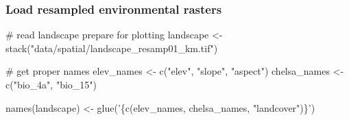 \documentclass[
]{article}
\newenvironment{Shaded}{}{}
\newcommand{\CommentTok}[1]{\textcolor[rgb]{0.00,0.50,0.00}{#1}}
\newcommand{\KeywordTok}[1]{\textcolor[rgb]{0.00,0.00,1.00}{#1}}
\newcommand{\NormalTok}[1]{#1}
\newcommand{\StringTok}[1]{\textcolor[rgb]{0.00,0.50,0.50}{#1}}
\begin{document}
\hypertarget{load-resampled-environmental-rasters}{%
\subsubsection{Load resampled environmental rasters}\label{load-resampled-environmental-rasters}}

\begin{Shaded}
\begin{Highlighting}[]
\CommentTok{# read landscape prepare for plotting}
\NormalTok{landscape <-}\StringTok{ }\KeywordTok{stack}\NormalTok{(}\StringTok{"data/spatial/landscape_resamp01_km.tif"}\NormalTok{)}

\CommentTok{# get proper names}
\NormalTok{elev_names <-}\StringTok{ }\KeywordTok{c}\NormalTok{(}\StringTok{"elev"}\NormalTok{, }\StringTok{"slope"}\NormalTok{, }\StringTok{"aspect"}\NormalTok{)}
\NormalTok{chelsa_names <-}\StringTok{ }\KeywordTok{c}\NormalTok{(}\StringTok{"bio_4a"}\NormalTok{, }\StringTok{"bio_15"}\NormalTok{)}

\KeywordTok{names}\NormalTok{(landscape) <-}\StringTok{ }\KeywordTok{glue}\NormalTok{(}\StringTok{'\{c(elev_names, chelsa_names, "landcover")\}'}\NormalTok{)}
\end{Highlighting}
\end{Shaded}
\end{document}

